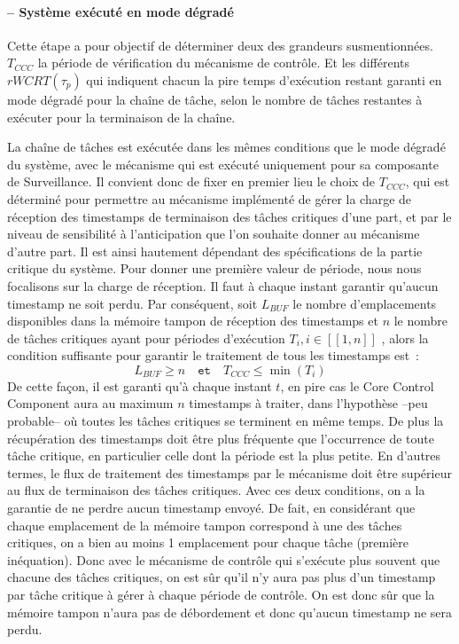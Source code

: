 \documentclass[french, a4paper, 11pt, twoside, pdftex]{StyleThese}
\begin{document}
    	\paragraph{ -- Système exécuté en mode dégradé}
    	
    		Cette étape a pour objectif de déterminer deux des grandeurs susmentionnées. $T_{CCC}$ la période de vérification du mécanisme de contrôle. Et les différents $rWCRT(\tau_p)$ qui indiquent chacun la pire temps d'exécution restant garanti en mode dégradé pour la chaîne de tâche, selon le nombre de tâches restantes à exécuter pour la terminaison de la chaîne. 
    		
    		La chaîne de tâches est exécutée dans les mêmes conditions que le mode dégradé du système, avec le mécanisme qui est exécuté uniquement pour sa composante de Surveillance. Il convient donc de fixer en premier lieu le choix de $T_{CCC}$, qui est déterminé pour permettre au mécanisme implémenté de gérer la charge de réception des timestamps de terminaison des tâches critiques d'une part, et par le niveau de sensibilité à l'anticipation que l'on souhaite donner au mécanisme d'autre part. Il est ainsi hautement dépendant des spécifications de la partie critique du système. 
    		Pour donner une première valeur de période, nous nous focalisons sur la charge de réception. Il faut à chaque instant garantir qu'aucun timestamp ne soit perdu. Par conséquent, soit $L_{BUF}$ le nombre d'emplacements disponibles dans la mémoire tampon de réception des timestamps et $n$ le nombre de tâches critiques ayant pour périodes d'exécution $T_i, i \in [\![1,n]\!]$ , alors la condition suffisante pour garantir le traitement de tous les timestamps est~:
    		\begin{equation}\label{eq:conditionsMemoireControle}
    			L_{BUF} \geq n  \quad \texttt{et} \quad T_{CCC} \leq \min{(T_i)}
    		\end{equation}
    		De cette façon, il est garanti qu'à chaque instant $t$, en pire cas le Core Control Component aura au maximum $n$ timestamps à traiter, dans l'hypothèse --peu probable-- où toutes les tâches critiques se terminent en même temps. 
    		De plus la récupération des timestamps doit être plus fréquente que l'occurrence de toute tâche critique, en particulier celle dont la période est la plus petite. En d'autres termes, le flux de traitement des timestamps par le mécanisme doit être supérieur au flux de terminaison des tâches critiques. 
    		Avec ces deux conditions, on a la garantie de ne perdre aucun timestamp envoyé. De fait, en considérant que chaque emplacement de la mémoire tampon correspond à une des tâches critiques, on a bien au moins 1 emplacement pour chaque tâche (première inéquation). Donc avec le mécanisme de contrôle qui s'exécute plus souvent que chacune des tâches critiques, on est sûr qu'il n'y aura pas plus d'un timestamp par tâche critique à gérer à chaque période de contrôle. On est donc sûr que la mémoire tampon n'aura pas de débordement et donc qu'aucun timestamp ne sera perdu. 
    		
\end{document}
